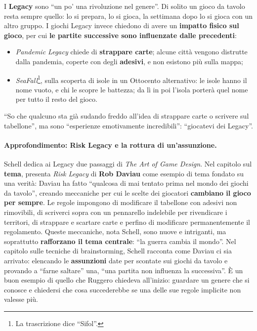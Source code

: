 I \textbf{Legacy} sono ``un po' una rivoluzione nel genere''. Di solito un gioco
da tavolo resta sempre quello: lo si prepara, lo si gioca, la settimana dopo lo
si gioca con un altro gruppo. I giochi Legacy invece chiedono di avere un
\textbf{impatto fisico sul gioco}, per cui \textbf{le partite successive sono
influenzate dalle precedenti}:
\begin{itemize}
  \item \emph{Pandemic Legacy} chiede di \textbf{strappare carte}; alcune città
        vengono distrutte dalla pandemia, coperte con degli \textbf{adesivi}, e
        non esistono più sulla mappa;
  \item \emph{SeaFall}\footnote{La trascrizione dice ``Sifol''.}, sulla scoperta
        di isole in un Ottocento alternativo: le isole hanno il nome vuoto, e chi
        le scopre le battezza; da lì in poi l'isola porterà quel nome per tutto
        il resto del gioco.
\end{itemize}
``So che qualcuno sta già sudando freddo all'idea di strappare carte o scrivere
sul tabellone'', ma sono ``esperienze emotivamente incredibili'': ``giocatevi dei
Legacy''.

\paragraph{Approfondimento: Risk Legacy e la rottura di un'assunzione.} Schell
dedica ai Legacy due passaggi di \emph{The Art of Game Design}. Nel capitolo sul
\textbf{tema}, presenta \emph{Risk Legacy} di \textbf{Rob Daviau} come esempio di
tema fondato su una verità: Daviau ha fatto ``qualcosa di mai tentato prima nel
mondo dei giochi da tavolo'', creando meccaniche per cui le scelte dei giocatori
\textbf{cambiano il gioco per sempre}. Le regole impongono di modificare il
tabellone con adesivi non rimovibili, di scriverci sopra con un pennarello
indelebile per rivendicare i territori, di strappare e scartare carte e perfino
di modificare permanentemente il regolamento. Queste meccaniche, nota Schell,
sono nuove e intriganti, ma soprattutto \textbf{rafforzano il tema centrale}:
``la guerra cambia il mondo''. Nel capitolo sulle tecniche di brainstorming,
Schell racconta come Daviau ci sia arrivato: elencando le \textbf{assunzioni}
date per scontate sui giochi da tavolo e provando a ``farne saltare'' una,
``una partita non influenza la successiva''. È un buon esempio di quello che
Ruggero chiedeva all'inizio: guardare un genere che si conosce e chiedersi che
cosa succederebbe se una delle sue regole implicite non valesse più.

